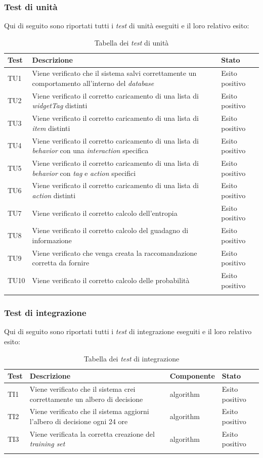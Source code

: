 \subsubsection{Test di unità}
Qui di seguito sono riportati tutti i \emph{test} di unità eseguiti e il loro relativo esito:
\def\arraystretch{1.8}
\begin{longtable}{|l|p{7cm}|l|}
\hline
\textbf{Test} &	\textbf{Descrizione}	&	\textbf{Stato}	\\\hline
TU1	&	Viene verificato che il sistema salvi correttamente un comportamento all'interno del \emph{database}	&	Esito positivo	\\\hline
TU2	&	Viene verificato il corretto caricamento di una lista di \emph{widgetTag} distinti	&	Esito positivo	\\\hline
TU3	&	Viene verificato il corretto caricamento di una lista di \emph{item} distinti	&	Esito positivo	\\\hline
TU4	&	Viene verificato il corretto caricamento di una lista di \emph{behavior} con una \emph{interaction} specifica	&	Esito positivo	\\\hline
TU5	&	Viene verificato il corretto caricamento di una lista di \emph{behavior} con \emph{tag} e \emph{action} specifici	&	Esito positivo	\\\hline
TU6	&	Viene verificato il corretto caricamento di una lista di \emph{action} distinti	&	Esito positivo	\\\hline
TU7	&	Viene verificato il corretto calcolo dell'entropia	&	Esito positivo	\\\hline
TU8	&	Viene verificato il corretto calcolo del guadagno di informazione	&	Esito positivo	\\\hline
TU9	&	Viene verificato che venga creata la raccomandazione corretta da fornire	&	Esito positivo	\\\hline
TU10	&	Viene verificato il corretto calcolo delle probabilità	&	Esito positivo	\\\hline
\caption{Tabella dei \emph{test} di unità}
\end{longtable}
\subsubsection{Test di integrazione}
Qui di seguito sono riportati tutti i \emph{test} di integrazione eseguiti e il loro relativo esito:
\def\arraystretch{1.8}
\begin{longtable}{|l|p{7cm}|l|l|}
\hline
\textbf{Test} &	\textbf{Descrizione}	&	\textbf{Componente}	&	\textbf{Stato}	\\\hline
TI1	&	Viene verificato che il sistema crei correttamente un albero di decisione	&	algorithm	&	Esito positivo	\\\hline
TI2	&	Viene verificato che il sistema aggiorni l'albero di decisione ogni 24 ore	&	algorithm	&	Esito positivo	\\\hline
TI3	&	Viene verificata la corretta creazione del \emph{training set}		&	algorithm	&	Esito positivo	\\\hline
\caption{Tabella dei \emph{test} di integrazione}
\end{longtable}
